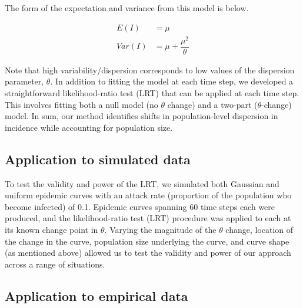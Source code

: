 \documentclass[10pt,letterpaper]{article}
\begin{document}
The form of the expectation and variance from this model is below.

\begin{align}
  E(I) &= \mu\\
  Var(I) &= \mu + \dfrac{\mu^2}{\theta}
\end{align}

Note that high variability/dispersion corresponds to low values of the dispersion parameter, \begin{math}\theta\end{math}.
In addition to fitting the model at each time step, we developed a straightforward likelihood-ratio test (LRT) that can be applied at each time step. This involves fitting both a null model (no \begin{math}\theta\end{math} change) and a two-part (\begin{math}\theta\end{math}-change) model.
In sum, our method identifies shifts in population-level dispersion in incidence while accounting for population size. 

\subsection*{Application to simulated data}

To test the validity and power of the LRT, we simulated both Gaussian and uniform epidemic curves with an attack rate (proportion of the population who become infected) of 0.1. Epidemic curves spanning 60 time steps each were produced, and the likelihood-ratio test (LRT) procedure was applied to each at its known change point in \begin{math}\theta\end{math}. 
Varying the magnitude of the \begin{math}\theta\end{math} change, location of the change in the curve, population size underlying the curve, and curve shape (as mentioned above) allowed us to test the validity and power of our approach across a range of situations.

\subsection*{Application to empirical data}
\end{document}
